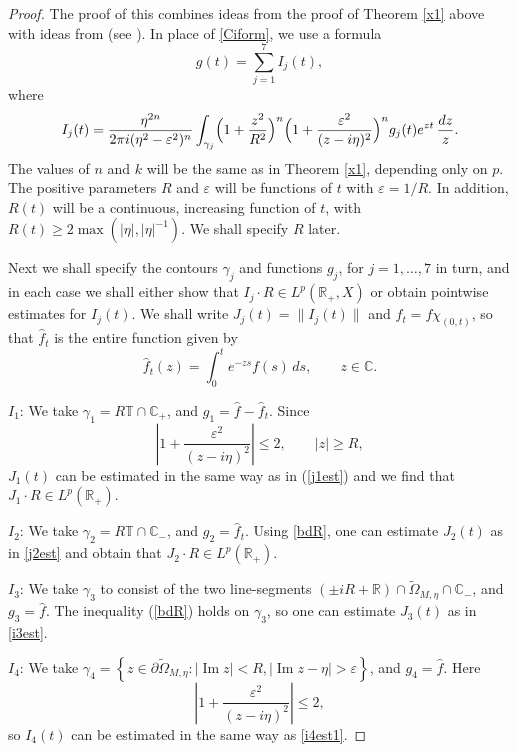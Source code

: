 \documentclass[11pt]{amsart}
\theoremstyle{definition}
\theoremstyle{remark}
\numberwithin{equation}{section}
\begin{document}
\begin{proof}
The proof of this combines ideas from the proof of Theorem \ref{x1} above with ideas from \cite{ArBa88} (see \cite[Theorem 4.4.8]{ABHN01}).
In place of \eqref{Ciform}, we use a formula
\[
g(t)= \sum_{j=1}^7 I_j(t),
\]
where
\[
I_j(t) = \frac {\eta^{2n}}{2\pi i(\eta^2-{{\varepsilon}}^2)^n}\int_{\gamma_j}
\Bigl(1+\frac {z^2}{R^2}\Bigr)^n \Bigl(1 + \frac {{{\varepsilon}}^2}{(z-i\eta)^2} \Bigr)^n g_j(t) e^{zt}\,\frac{dz}{z}.
\]
The values of $n$ and $k$ will be the same as in Theorem \ref{x1}, depending only on $p$.   The positive parameters $R$ and ${{\varepsilon}}$ will be functions of $t$ with ${{\varepsilon}} = 1/R$.
In addition, $R(t)$ will be a continuous, increasing function of $t$, with
$R(t) \ge 2\max(|\eta|,|\eta|^{-1})$.  We shall specify $R$ later.

Next we shall specify the contours $\gamma_j$ and functions $g_j$, for $j=1,\dots,7$ in turn, and in each case we shall either show that $I_j \cdot R \in L^p({{\mathbb R}}_+,X)$ or obtain pointwise estimates for $I_j(t)$.  We shall write $J_j(t) = \|I_j(t)\|$ and $f_t = f \chi_{(0,t)}$, so that $\widehat f_t$ is the entire function given by
\[
\widehat f_t(z) = \int_0^t e^{-zs} f(s) \, ds, \qquad z \in {{\mathbb C}}.
\]

\noindent  $I_1$:  We take $\gamma_1 = R{{\mathbb T}} \cap {{\mathbb C}}_+$, and $g_1 = \widehat f - \widehat f_t$.   Since
\begin{equation} \label{bdR}
\left|1 + \frac {{{\varepsilon}}^2}{(z-i\eta)^2} \right|  \le  2, \qquad |z|\ge R,
\end{equation}
$J_1(t)$ can be estimated in the same way as in (\ref{j1est}) and we find that $J_1 \cdot R \in L^p({{\mathbb R}}_+)$.

\noindent  $I_2$:  We take $\gamma_2 = R{{\mathbb T}} \cap {{\mathbb C}}_-$, and $g_2 = \widehat f_t$.  Using \eqref{bdR}, one can estimate $J_2(t)$ as in \eqref{j2est} and obtain that $J_2 \cdot R \in L^p({{\mathbb R}}_+)$.

\noindent  $I_3$:  We take $\gamma_3$ to consist of the two line-segments $(\pm iR + {{\mathbb R}}) \cap \widetilde \Omega_{M,\eta} \cap {{\mathbb C}}_-$,  and $g_3 = \widehat f$.  The inequality (\ref{bdR}) holds on $\gamma_3$, so one can estimate $J_3(t)$ as in \eqref{i3est}.

\noindent $I_4$:  We take $\gamma_4 = \left\{ z \in\partial \widetilde\Omega_{M,\eta} : |{\operatorname{Im}} z| < R, |{\operatorname{Im}} z - \eta| > {{\varepsilon}} \right\}$, and $g_4 = \widehat f$.  Here
\[
\left| 1 + \frac{{{\varepsilon}}^2}{(z-i\eta)^2} \right| \le 2,
\]
so $I_4(t)$ can be estimated in the same way as \eqref{i4est1}.


\end{proof}
\end{document}
